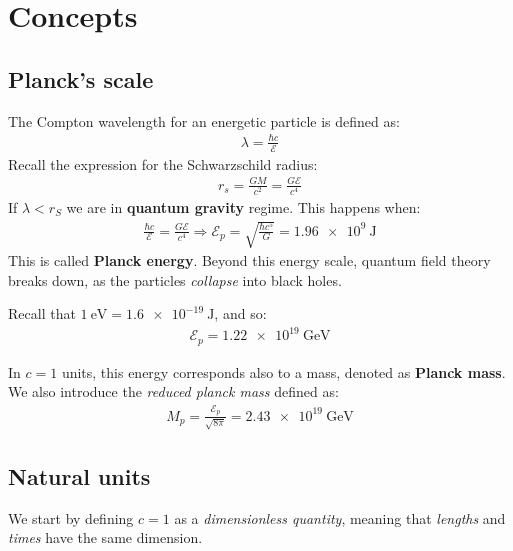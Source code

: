 \documentclass[../template.tex]{subfiles}
\begin{document}
\section{Concepts}
\subsection{Planck's scale}
The Compton wavelength for an energetic particle is defined as:
\begin{align*}
    \lambda = \frac{\hbar c}{\mathcal{E}} 
\end{align*}
Recall the expression for the Schwarzschild radius:
\begin{align*}
    r_s = \frac{GM}{c^2} = \frac{G \mathcal{E}}{c^4}  
\end{align*}
If $\lambda < r_S$ we are in \textbf{quantum gravity} regime. This happens when:
\begin{align*}
    \frac{\hbar c}{\mathcal{E}} = \frac{G \mathcal{E}}{c^4} \Rightarrow \mathcal{E}_p=\sqrt{\frac{\hbar c^5}{G} } = \SI{1.96e9}{\J}  
\end{align*}
This is called \textbf{Planck energy}. Beyond this energy scale, quantum field theory breaks down, as the particles \textit{collapse} into black holes.

Recall that $\SI{1}{\eV} = \SI{1.6e-19}{\J}$, and so:
\begin{align*}
    \mathcal{E}_p = \SI{1.22e19}{\giga\eV}
\end{align*} 

In $c=1$ units, this energy corresponds also to a mass, denoted as \textbf{Planck mass}.   We also introduce the \textit{reduced planck mass} defined as:
\begin{align*}
    M_p = \frac{\mathcal{E}_p}{\sqrt{8 \pi}} = \SI{2.43e19}{\giga\eV} 
\end{align*} 
\subsection{Natural units}
We start by defining $c=1$ as a \textit{dimensionless quantity}, meaning that \textit{lengths} and \textit{times} have the same dimension.
\end{document}
